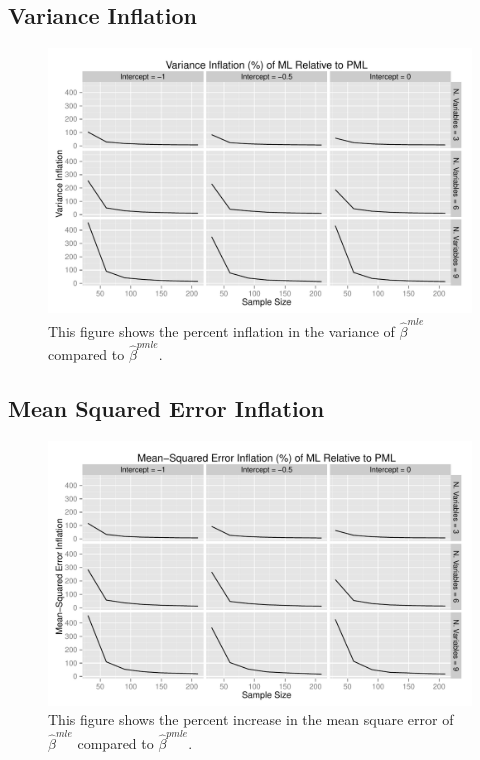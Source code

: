 \documentclass[12pt]{article}
\begin{document}
\begin{appendix}
\subsection{Variance Inflation}

\begin{figure}[H]
\begin{center}
\includegraphics[width = \textwidth]{figs/sims-var-infl.pdf}
\caption{This figure shows the percent inflation in the variance of $\hat{\beta}^{mle}$ compared to $\hat{\beta}^{pmle}$.}\label{fig:var-infl}
\end{center}
\end{figure}

\subsection{Mean Squared Error Inflation}

\begin{figure}[H]
\begin{center}
\includegraphics[width = \textwidth]{figs/sims-mse-infl.pdf}
\caption{This figure shows the percent increase in the mean square error of $\hat{\beta}^{mle}$ compared to $\hat{\beta}^{pmle}$.}\label{fig:mse}
\end{center}
\end{figure}


\end{appendix}
\end{document}
